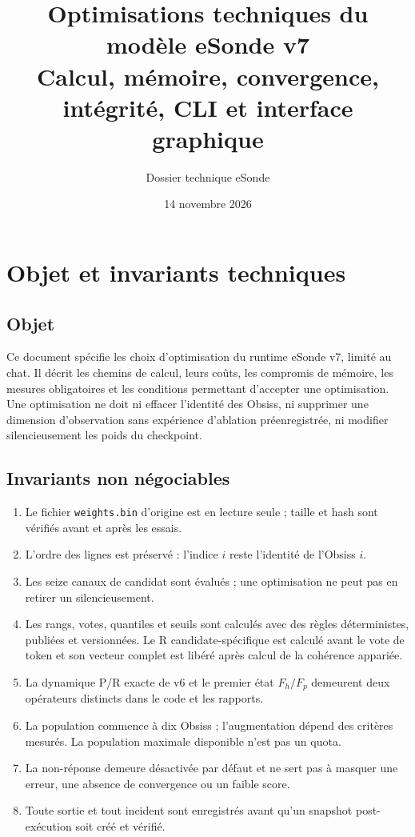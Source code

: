 \documentclass[11pt,a4paper]{report}
\title{\textbf{Optimisations techniques du modèle eSonde v7}\\[0.5em]\large Calcul, mémoire, convergence, intégrité, CLI et interface graphique}
\author{Dossier technique eSonde}
\date{14 novembre 2026}
\begin{document}
\maketitle
\tableofcontents
\clearpage
{}

\chapter{Objet et invariants techniques}
\section{Objet}
Ce document spécifie les choix d'optimisation du runtime eSonde v7, limité au chat. Il décrit les chemins de calcul, leurs coûts, les compromis de mémoire, les mesures obligatoires et les conditions permettant d'accepter une optimisation. Une optimisation ne doit ni effacer l'identité des Obsiss, ni supprimer une dimension d'observation sans expérience d'ablation préenregistrée, ni modifier silencieusement les poids du checkpoint.

\section{Invariants non négociables}
\begin{enumerate}[nosep]
\item Le fichier \texttt{weights.bin} d'origine est en lecture seule ; taille et hash sont vérifiés avant et après les essais.
\item L'ordre des lignes est préservé : l'indice $i$ reste l'identité de l'Obsiss $i$.
\item Les seize canaux de candidat sont évalués ; une optimisation ne peut pas en retirer un silencieusement.
\item Les rangs, votes, quantiles et seuils sont calculés avec des règles déterministes, publiées et versionnées. Le R candidate-spécifique est calculé avant le vote de token et son vecteur complet est libéré après calcul de la cohérence appariée.
\item La dynamique P/R exacte de v6 et le premier état $F_h/F_p$ demeurent deux opérateurs distincts dans le code et les rapports.
\item La population commence à dix Obsiss ; l'augmentation dépend des critères mesurés. La population maximale disponible n'est pas un quota.
\item La non-réponse demeure désactivée par défaut et ne sert pas à masquer une erreur, une absence de convergence ou un faible score.
\item Toute sortie et tout incident sont enregistrés avant qu'un snapshot post-exécution soit créé et vérifié.
\end{enumerate}
\end{document}
